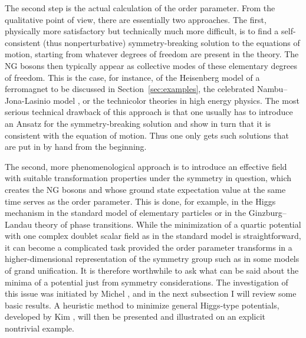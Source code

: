 \documentclass[final,3p,times,12pt,a4paper,sort&compress]{elsarticle}
\begin{document}
The second step is the actual calculation of the order parameter. From the
qualitative point of view, there are essentially two approaches. The first,
physically more satisfactory but technically much more difficult, is to find a
self-consistent (thus nonperturbative) symmetry-breaking solution to the
equations of motion, starting from whatever degrees of freedom are present in
the theory. The NG bosons then typically appear as collective modes of these
elementary degrees of freedom. This is the case, for instance, of the
Heisenberg model of a ferromagnet to be discussed in Section~\ref{sec:examples},
the celebrated Nambu--Jona-Lasinio model \cite{Nambu:1961tp,Nambu:1961fr}, or
the technicolor theories in high energy physics. The most serious technical
drawback of this approach is that one usually has to introduce an Ansatz for the
symmetry-breaking solution and show in turn that it is consistent with the
equation of motion. Thus one only gets such solutions that are put in by hand
from the beginning.

The second, more phenomenological approach is to introduce an effective field
with suitable transformation properties under the symmetry in question, which
creates the NG bosons and whose ground state expectation value at the same time
serves as the order parameter. This is done, for example, in the Higgs mechanism
in the standard model of elementary particles or in the Ginzburg--Landau theory
of phase transitions. While the minimization of a quartic potential with one
complex doublet scalar field as in the standard model is straightforward, it
can become a complicated task provided the order parameter transforms in a
higher-dimensional representation of the symmetry group such as in some models
of grand unification. It is therefore worthwhile to ask what can be said about
the minima of a potential just from symmetry considerations. The investigation
of this issue was initiated by Michel \cite{Michel:1971th,Michel:1980pc}, and
in the next subsection I will review some basic results. A heuristic method to
minimize general Higgs-type potentials, developed by Kim \cite{Kim:1981xu},
will then be presented and illustrated on an explicit nontrivial example.
\end{document}
